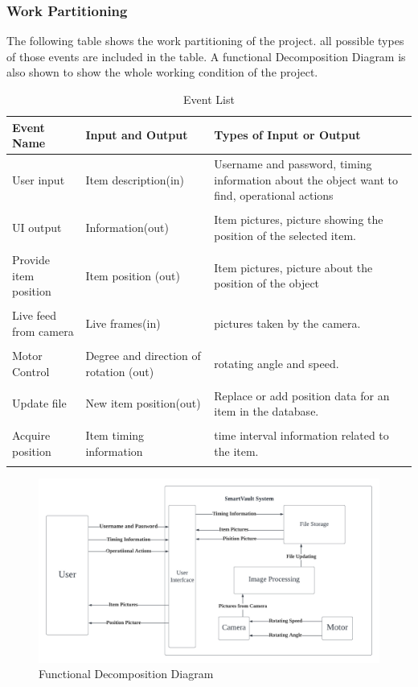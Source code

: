 \documentclass[12pt]{article}
\begin{document}
\subsubsection{Work Partitioning}
The following table shows the work partitioning of the project. all possible types of those events are included in the table. A functional Decomposition Diagram is also shown to show the whole working condition of the project. 
\begin{table}[H]
\caption{Event List} 
\begin{tabularx}{\textwidth}{XXX}
\toprule
\textbf{Event Name} & \textbf{Input and Output} & \textbf{Types of Input or Output}\\
\midrule
User input & Item description(in) & Username and password, timing information about the object want to find, operational  actions\\\\
UI output &  Information(out) & Item pictures, picture showing the position of the selected item.\\\\
Provide item position & Item position (out) & Item pictures, picture about the position of the object\\\\
Live feed from camera & Live frames(in) & pictures taken by the camera.\\\\
Motor Control& Degree and direction of rotation (out) & rotating angle and speed.\\\\
Update file & New item position(out) & Replace or add position data for an item in the database.\\\\
Acquire position & Item timing information & time interval information related to the item.\\\\

\bottomrule
\end{tabularx}
\end{table}

\begin{figure}[H]
    \centering
    \includegraphics[scale=0.3]{Function_Decom.png}
    \caption{Functional Decomposition Diagram}
\end{figure}
\end{document}
